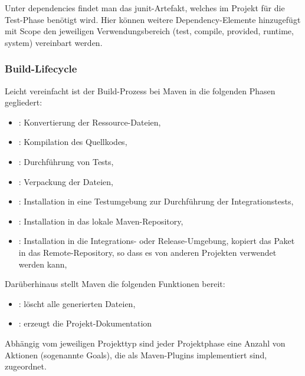 Unter dependencies findet man
das junit-Artefakt, welches im Projekt für die Test-Phase
benötigt wird. Hier können weitere Dependency-Elemente
hinzugefügt mit Scope den jeweiligen Verwendungsbereich
 (test, compile, provided, runtime, system) vereinbart werden.
%
%
\newslide
\subsubsection{Build-Lifecycle}
Leicht vereinfacht ist der Build-Prozess bei Maven
in die folgenden Phasen gegliedert:
\begin{itemize}
\item {}: Konvertierung der Ressource-Dateien,
\item {}: Kompilation des Quellkodes,
\item {}: Durchführung von Tests,
\item {}: Verpackung der Dateien,
\item {}: Installation in eine Testumgebung zur
  Durchführung der Integrationstests,
\newslide
\item {}: Installation in das lokale Maven-Repository,
\item {}: Installation in die Integrations-
                        oder Release-Umgebung,
 kopiert das Paket in das  Remote-Repository, so dass es von anderen
 Projekten verwendet werden kann,
\end{itemize}
%
Darüberhinaus stellt Maven die folgenden Funktionen bereit:
\begin{itemize}
\item {}: löscht alle generierten Dateien,
\item {}: erzeugt die Projekt-Dokumentation
\end{itemize}
\newslide
Abhängig vom jeweiligen Projekttyp
 sind jeder Projektphase eine Anzahl
von Aktionen (sogenannte Goals),
die als Maven-Plugins implementiert sind, zugeordnet.

